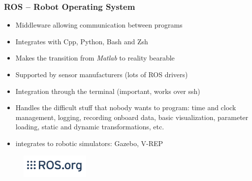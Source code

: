\documentclass[aspectratio=1610]{beamer}
\begin{document}


\begin{frame}
  \frametitle{ROS -- Robot Operating System}

  \begin{itemize}
    \item Middleware allowing communication between programs
    \item Integrates with Cpp, Python, Bash and Zsh
    \item Makes the transition from \emph{Matlab} to reality bearable
    \item Supported by sensor manufacturers (lots of ROS drivers)
    \item Integration through the terminal (important, works over ssh)
    \item Handles the difficult stuff that nobody wants to program: time and clock management, logging, recording onboard data, basic visualization, parameter loading, static and dynamic transformations, etc.
    \item integrates to robotic simulators: Gazebo, V-REP
  \end{itemize}

  \begin{figure}
    \includegraphics[width=0.3\textwidth]{./fig/ros_logo.jpg}
  \end{figure}

\end{frame}

\end{document}
